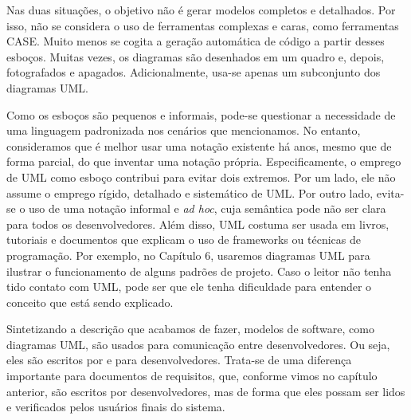 \documentclass[
  11pt,
  twoside]{book}
\begin{document}
Nas duas situações, o objetivo não é gerar modelos completos e
detalhados. Por isso, não se considera o uso de ferramentas complexas e
caras, como ferramentas CASE. Muito menos se cogita a geração automática
de código a partir desses esboços. Muitas vezes, os diagramas são
desenhados em um quadro e, depois, fotografados e apagados.
Adicionalmente, usa-se apenas um subconjunto dos diagramas UML.

Como os esboços são pequenos e informais, pode-se questionar a
necessidade de uma linguagem padronizada nos cenários que mencionamos.
No entanto, consideramos que é melhor usar uma notação existente há
anos, mesmo que de forma parcial, do que inventar uma notação própria.
Especificamente, o emprego de UML como esboço contribui para evitar dois
extremos. Por um lado, ele não assume o emprego rígido, detalhado e
sistemático de UML. Por outro lado, evita-se o uso de uma notação
informal e \emph{ad hoc}, cuja semântica pode não ser clara para todos
os desenvolvedores. Além disso, UML costuma ser usada em livros,
tutoriais e documentos que explicam o uso de frameworks ou técnicas de
programação. Por exemplo, no Capítulo 6, usaremos diagramas UML para
ilustrar o funcionamento de alguns padrões de projeto. Caso o leitor não
tenha tido contato com UML, pode ser que ele tenha dificuldade para
entender o conceito que está sendo explicado.

Sintetizando a descrição que acabamos de fazer, modelos de software,
como diagramas UML, são usados para comunicação entre desenvolvedores.
Ou seja, eles são escritos por e para desenvolvedores. Trata-se de uma
diferença importante para documentos de requisitos, que, conforme vimos
no capítulo anterior, são escritos por desenvolvedores, mas de forma que
eles possam ser lidos e verificados pelos usuários finais do sistema.
\end{document}

